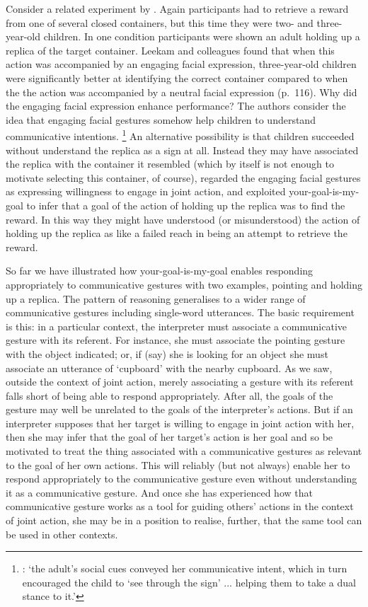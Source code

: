 \documentclass[14pt,a4paper]{extarticle}
\begin{document}
Consider a related experiment by \citet{leekam_adults_2010}.
Again participants had to retrieve a reward from one of several closed containers, but this time they were two- and three-year-old children.
In one condition participants were shown an adult holding up a replica of the target container.
Leekam and colleagues found that 
when this action was accompanied by an engaging facial expression,
three-year-old children were significantly better at identifying the correct container compared to
when the the action was accompanied by a neutral facial expression (p.\ 116).
Why did the engaging facial expression enhance performance?
The authors consider the idea that 
engaging facial gestures somehow help children to understand communicative intentions.%
\footnote{
\citet[p.\ 118]{leekam_adults_2010}: `the adult’s social cues conveyed her communicative intent, which in turn encouraged the child to ‘see through the sign’ ... helping them  to take a dual stance to it.'
}
An alternative possibility is that children succeeded without understand the replica as a sign at all.
Instead they may have 
associated the replica with the container it resembled
(which by itself is not enough to motivate selecting this container, of course),
regarded the engaging facial gestures as expressing willingness to engage in joint action,
and 
exploited your-goal-is-my-goal 
	to infer that a goal of the action of holding up the replica was to find the reward.
In this way they might have understood (or misunderstood) the action of holding up the replica as 
like a failed reach
in being an attempt to retrieve the reward.

So far we have illustrated how your-goal-is-my-goal enables responding appropriately to communicative gestures with two examples, pointing and holding up a replica.
The pattern of reasoning generalises to a wider range of communicative gestures including single-word utterances.
The basic requirement is this: in a particular context, the interpreter must associate a communicative gesture with its referent.
For instance, she must associate the pointing gesture with the object indicated; or, if (say) she is looking for an object she must associate an utterance of `cupboard' with the nearby cupboard.
As we saw, 
outside the context of joint action,
merely associating a gesture with its referent falls short of being able to respond appropriately.
After all, the goals of the gesture may well be unrelated to the goals of the interpreter's actions.
But if an interpreter supposes that her target is willing to engage in joint action with her,
then she may infer that the goal of her target's action is her goal
and so be motivated to treat the thing associated with a communicative gestures as relevant to the goal of her own actions.
This will reliably (but not always) enable her to respond appropriately to the communicative gesture even without understanding it as a communicative gesture.
And once she has experienced how that communicative gesture works as a tool for guiding others' actions in the context of joint action,
she may be in a position to realise, further, that the same tool can be used in other contexts.
\end{document}
